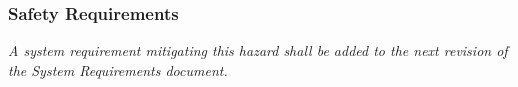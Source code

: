 \documentclass[fullpage]{article}
\begin{document}
\subsubsection*{Safety Requirements}
\emph{A system requirement mitigating this hazard shall be added to the next revision of the System Requirements document.}

\begin{comment}
\begin{thebibliography}{9}

\bibitem{website}
S. Liu, “Canada most popular desktop browsers 2021,” Statista, 04-Oct-2021. [Online]. Available: https://www.statista.com/statistics/499462/most-popular-desktop-browsers-in-canada-by-market-share/. [Accessed: 17-Oct-2021].

\end{thebibliography}
\end{comment}
\end{document}
